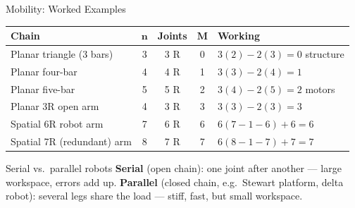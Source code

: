 \documentclass[aspectratio=169]{beamer}
\begin{document}
	\begin{frame}{Mobility: Worked Examples}
		\renewcommand{\arraystretch}{1.35}
		\centering
		\small
		\begin{tabular}{@{}>{\raggedright}p{3.8cm}cccp{4.4cm}@{}}
			\toprule
			\textbf{Chain} & $\bm{n}$ & \textbf{Joints} & $\bm{M}$ & \textbf{Working} \\
			\midrule
			Planar triangle (3 bars)   & 3 & 3 R & 0 & $3(2) - 2(3) = 0$ \; structure \\
			Planar four-bar            & 4 & 4 R & 1 & $3(3) - 2(4) = 1$ \\
			Planar five-bar            & 5 & 5 R & 2 & $3(4) - 2(5) = 2$ \; 2 motors \\
			Planar 3R open arm         & 4 & 3 R & 3 & $3(3) - 2(3) = 3$ \\
			Spatial 6R robot arm       & 7 & 6 R & 6 & $6(7-1-6) + 6 = 6$ \\
			Spatial 7R (redundant) arm & 8 & 7 R & 7 & $6(8-1-7) + 7 = 7$ \\
			\bottomrule
		\end{tabular}
		\vspace{0.3cm}
		\begin{block}{Serial vs.\ parallel robots}
			\small \textbf{Serial} (open chain): one joint after another --- large workspace, errors add up. \textbf{Parallel} (closed chain, e.g.\ Stewart platform, delta robot): several legs share the load --- stiff, fast, but small workspace.
		\end{block}
	\end{frame}

\end{document}
